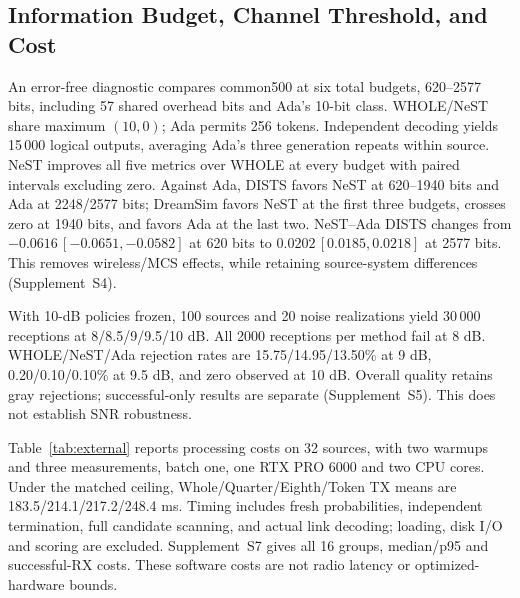 \subsection{Information Budget, Channel Threshold, and Cost}
An error-free diagnostic compares common500 at six total budgets, 620--2577 bits, including 57 shared overhead bits and Ada's 10-bit class. WHOLE/NeST share maximum $(10,0)$; Ada permits 256 tokens. Independent decoding yields 15\,000 logical outputs, averaging Ada's three generation repeats within source. NeST improves all five metrics over WHOLE at every budget with paired intervals excluding zero. Against Ada, DISTS favors NeST at 620--1940 bits and Ada at 2248/2577 bits; DreamSim favors NeST at the first three budgets, crosses zero at 1940 bits, and favors Ada at the last two. NeST--Ada DISTS changes from $-0.0616\,[-0.0651,-0.0582]$ at 620 bits to $0.0202\,[0.0185,0.0218]$ at 2577 bits. This removes wireless/MCS effects, while retaining source-system differences (Supplement~S4).

With 10-dB policies frozen, 100 sources and 20 noise realizations yield 30\,000 receptions at 8/8.5/9/9.5/10 dB. All 2000 receptions per method fail at 8 dB. WHOLE/NeST/Ada rejection rates are 15.75/14.95/13.50\% at 9 dB, 0.20/0.10/0.10\% at 9.5 dB, and zero observed at 10 dB. Overall quality retains gray rejections; successful-only results are separate (Supplement~S5). This does not establish SNR robustness.

Table~\ref{tab:external} reports processing costs on 32 sources, with two warmups and three measurements, batch one, one RTX PRO 6000 and two CPU cores. Under the matched ceiling, Whole/Quarter/Eighth/Token TX means are 183.5/214.1/217.2/248.4 ms. Timing includes fresh probabilities, independent termination, full candidate scanning, and actual link decoding; loading, disk I/O and scoring are excluded. Supplement~S7 gives all 16 groups, median/p95 and successful-RX costs. These software costs are not radio latency or optimized-hardware bounds.
